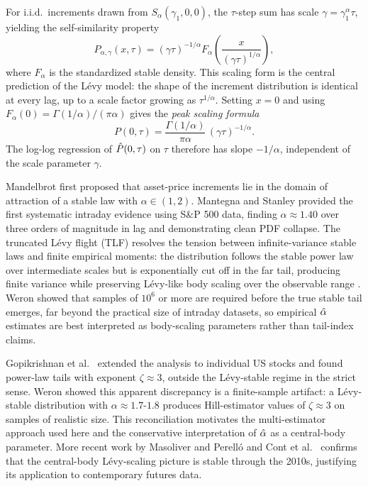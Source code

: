 \documentclass[12pt,a4paper]{article}
\begin{document}
For i.i.d.\ increments drawn from $S_\alpha(\gamma_1,0,0)$, the $\tau$-step sum
has scale $\gamma = \gamma_1^\alpha\tau$, yielding the self-similarity property
\begin{equation}
  P_{\alpha,\gamma}(x,\tau)
  = (\gamma\tau)^{-1/\alpha}
    F_\alpha\!\left(\frac{x}{(\gamma\tau)^{1/\alpha}}\right),
  \label{eq:scaling}
\end{equation}
where $F_\alpha$ is the standardized stable density. This scaling form is the
central prediction of the Lévy model: the shape of the increment distribution
is identical at every lag, up to a scale factor growing as $\tau^{1/\alpha}$.
Setting $x=0$ and using $F_\alpha(0) = \Gamma(1/\alpha)/(\pi\alpha)$ gives the
\textit{peak scaling formula}
\begin{equation}
  P(0,\tau)
  = \frac{\Gamma(1/\alpha)}{\pi\alpha}\,(\gamma\tau)^{-1/\alpha}.
  \label{eq:peak}
\end{equation}
The log-log regression of $\hat{P}(0,\tau)$ on $\tau$ therefore has slope
$-1/\alpha$, independent of the scale parameter $\gamma$.

Mandelbrot \cite{Mandelbrot1963} first proposed that asset-price increments lie in
the domain of attraction of a stable law with $\alpha\in(1,2)$.
Mantegna and Stanley \cite{MantegnaStanley1994,MantegnaStanley1995} provided the first
systematic intraday evidence using S\&P 500 data, finding $\alpha\approx 1.40$
over three orders of magnitude in lag and demonstrating clean PDF collapse.
The truncated Lévy flight (TLF) resolves the tension between
infinite-variance stable laws and finite empirical moments: the distribution
follows the stable power law over intermediate scales but is exponentially
cut off in the far tail, producing finite variance while preserving
Lévy-like body scaling over the observable range
\cite{MantegnaStanley1994,BouchaudPotters2003}. Weron \cite{Weron2001}
showed that samples of $10^6$ or more are required before the true stable tail
emerges, far beyond the practical size of intraday datasets, so empirical
$\hat{\alpha}$ estimates are best interpreted as body-scaling parameters rather
than tail-index claims.

Gopikrishnan et al.\ \cite{Gopikrishnan1999} extended the analysis to individual US stocks and
found power-law tails with exponent $\zeta\approx 3$, outside the Lévy-stable
regime in the strict sense. Weron \cite{Weron2001} showed this apparent
discrepancy is a finite-sample artifact: a Lévy-stable distribution with
$\alpha\approx 1.7$-$1.8$ produces Hill-estimator values of $\zeta\approx 3$
on samples of realistic size. This reconciliation motivates the
multi-estimator approach used here and the conservative
interpretation of $\hat{\alpha}$ as a central-body parameter. More recent work by
Masoliver and Perelló \cite{Masoliver2021} and Cont et al.\ \cite{ContMiami2023} confirms that the
central-body Lévy-scaling picture is stable through the 2010s, justifying its
application to contemporary futures data.
\end{document}
